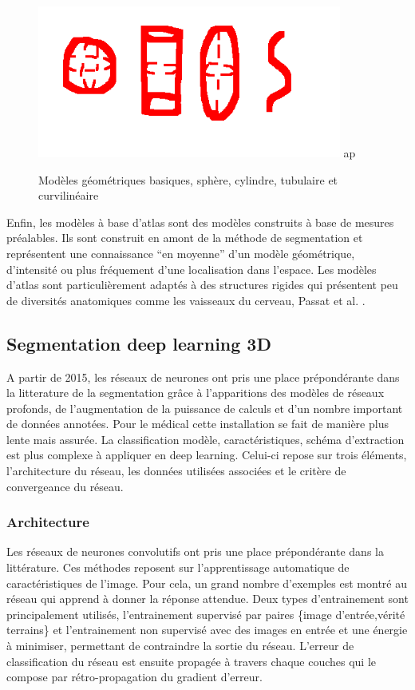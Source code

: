 \begin{figure}
  \centering
  \includegraphics[height=5cm]{Images/geometricModels.png}
ap  \label{fig:geometricModels}
  \caption{Modèles géométriques basiques, sphère, cylindre, tubulaire et curvilinéaire}
\end{figure}

Enfin, les modèles à base d'atlas sont des modèles construits à base de mesures préalables. Ils sont construit en amont de la méthode de segmentation et représentent une connaissance ``en moyenne'' d'un modèle géométrique, d'intensité ou plus fréquement d'une localisation dans l'espace. Les modèles d'atlas sont particulièrement adaptés à des structures rigides qui présentent peu de diversités anatomiques comme les vaisseaux du cerveau, Passat et al. \cite{passat2006_atlas}.

\subsection{Segmentation deep learning 3D}
\label{sec:EA:segmentation_deep3D}

A partir de 2015, les réseaux de neurones ont pris une place prépondérante dans la litterature de la segmentation grâce à l'apparitions des modèles de réseaux profonds, de l'augmentation de la puissance de calculs et d'un nombre important de données annotées. Pour le médical cette installation se fait de manière plus lente mais assurée. La classification  modèle, caractéristiques, schéma d'extraction est plus complexe à appliquer en deep learning. Celui-ci repose sur trois éléments, l'architecture du réseau, les données utilisées associées et le critère de convergeance du réseau.

\subsubsection{Architecture}
Les réseaux de neurones convolutifs ont pris une place prépondérante dans la littérature. Ces méthodes reposent sur l'apprentissage automatique de caractéristiques de l'image. Pour cela, un grand nombre d'exemples est montré au réseau qui apprend à donner la réponse attendue. Deux types d'entrainement sont principalement utilisés, l'entrainement supervisé par paires \{image d'entrée,vérité terrains\} et l'entrainement non supervisé avec des images en entrée et une énergie à minimiser, permettant de contraindre la sortie du réseau. L'erreur de classification du réseau est ensuite propagée à travers chaque couches qui le compose par rétro-propagation du gradient d'erreur.

